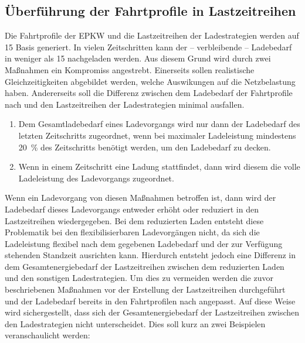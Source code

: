 \subsection{Überführung der Fahrtprofile in Lastzeitreihen}

Die Fahrtprofile der \gls{EPKW} und die Lastzeitreihen der Ladestrategien werden auf \SI{15}{\Minuten} Basis generiert.
In vielen Zeitschritten kann der {--} verbleibende {--} Ladebedarf in weniger als \SI{15}{\Minuten} nachgeladen werden.
Aus diesem Grund wird durch zwei Maßnahmen ein Kompromiss angestrebt.
Einerseits sollen realistische Gleichzeitigkeiten abgebildet werden, welche Auswikungen auf die Netzbelastung haben.
Andererseits soll die Differenz zwischen dem Ladebedarf der Fahrtprofile nach  und den Lastzeitreihen der Ladestrategien minimal ausfallen.

\begin{enumerate}
	\item Dem Gesamtladebedarf eines Ladevorgangs wird nur dann der Ladebedarf des letzten Zeitschritts zugeordnet, wenn bei maximaler Ladeleistung mindestens \SI{20}{\percent} des Zeitschritts benötigt werden, um den Ladebedarf zu decken.
	\item Wenn in einem Zeitschritt eine Ladung stattfindet, dann wird diesem die volle Ladeleistung des Ladevorgangs zugeordnet.
\end{enumerate}

Wenn ein Ladevorgang von diesen Maßnahmen betroffen ist, dann wird der Ladebedarf dieses Ladevorgangs entweder erhöht oder reduziert in den Lastzeitreihen wiedergegeben.
Bei dem reduzierten Laden entsteht diese Problematik bei den flexibilisierbaren Ladevorgängen nicht, da sich die Ladeleistung flexibel nach dem gegebenen Ladebedarf und der zur Verfügung stehenden Standzeit ausrichten kann.
Hierdurch entsteht jedoch eine Differenz in dem Gesamtenergiebedarf der Lastzeitreihen zwischen dem reduzierten Laden und den sonstigen Ladestrategien.
Um dies zu vermeiden werden die zuvor beschriebenen Maßnahmen vor der Erstellung der Lastzeitreihen durchgeführt und der Ladebedarf bereits in den Fahrtprofilen nach  angepasst.
Auf diese Weise wird sichergestellt, dass sich der Gesamtenergiebedarf der Lastzeitreihen zwischen den Ladestrategien nicht unterscheidet.
Dies soll kurz an zwei Beispielen veranschaulicht werden:

